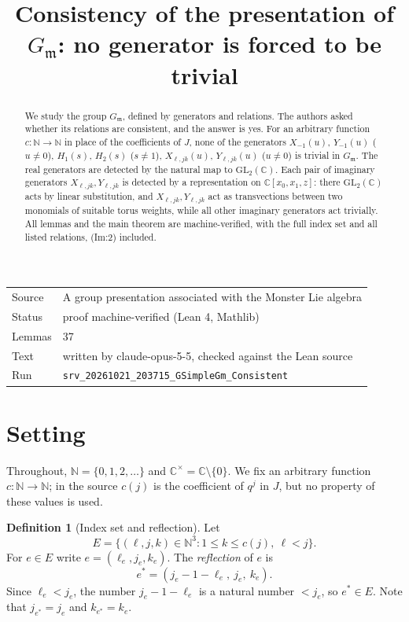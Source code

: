 \documentclass[11pt]{article}
\title{Consistency of the presentation of $G_{\mathfrak m}$: no generator is forced to be trivial}
\date{}
\theoremstyle{definition}
\newtheorem{definition}[theorem]{Definition}
\theoremstyle{remark}
\newcommand{\CC}{\mathbb{C}}
\newcommand{\NN}{\mathbb{N}}
\begin{document}
\maketitle
\begin{abstract}
We study the group $G_{\mathfrak m}$, defined by generators and relations. The authors asked whether its relations are consistent, and the answer is yes. For an arbitrary function $c\colon\mathbb N\to\mathbb N$ in place of the coefficients of $J$, none of the generators $X_{-1}(u)$, $Y_{-1}(u)$ ($u\neq0$), $H_1(s)$, $H_2(s)$ ($s\neq1$), $X_{\ell,jk}(u)$, $Y_{\ell,jk}(u)$ ($u\neq0$) is trivial in $G_{\mathfrak m}$. The real generators are detected by the natural map to $\mathrm{GL}_2(\mathbb C)$. Each pair of imaginary generators $X_{\ell,jk},Y_{\ell,jk}$ is detected by a representation on $\mathbb C[x_0,x_1,z]$: there $\mathrm{GL}_2(\mathbb C)$ acts by linear substitution, and $X_{\ell,jk},Y_{\ell,jk}$ act as transvections between two monomials of suitable torus weights, while all other imaginary generators act trivially. All lemmas and the main theorem are machine-verified, with the full index set and all listed relations, (Im:2) included.
\end{abstract}

\begin{center}\small
\begin{tabular}{@{}ll@{}}
\toprule
Source & A group presentation associated with the Monster Lie algebra \\
Status & proof machine-verified (Lean 4, Mathlib) \\
Lemmas & 37 \\
Text & written by claude-opus-5-5, checked against the Lean source \\
Run & \texttt{srv\_20261021\_203715\_GSimpleGm\_Consistent} \\
\bottomrule
\end{tabular}
\end{center}

\tableofcontents

\section{Setting}

Throughout, $\NN=\{0,1,2,\dots\}$ and $\CC^\times=\CC\setminus\{0\}$. We fix an arbitrary function $c\colon\NN\to\NN$; in the source $c(j)$ is the coefficient of $q^j$ in $J$, but no property of these values is used.

\begin{definition}[Index set and reflection]
Let
\[
E=\{(\ell,j,k)\in\NN^3 : 1\le k\le c(j),\ \ell<j\}.
\]
For $e\in E$ write $e=(\ell_e,j_e,k_e)$. The \emph{reflection} of $e$ is
\[
e^\ast=(j_e-1-\ell_e,\ j_e,\ k_e).
\]
Since $\ell_e<j_e$, the number $j_e-1-\ell_e$ is a natural number $<j_e$, so $e^\ast\in E$. Note that $j_{e^\ast}=j_e$ and $k_{e^\ast}=k_e$.
\end{definition}
\end{document}
